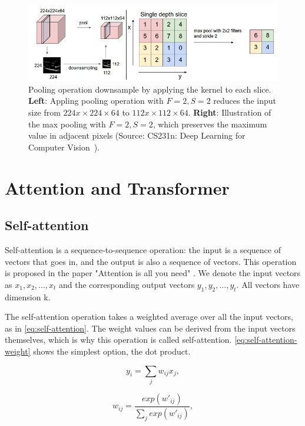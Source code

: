 \begin{figure}[h!]
    \centering
    \includegraphics[width=\linewidth]{content/resources/images/background/maxpool.png}
    \caption{Pooling operation downsample by applying the kernel to each slice. \textbf{Left}: Appling pooling operation with $F = 2, S = 2$ reduces the input size from $224x \times 224 \times 64$ to  $112x \times 112 \times 64$. \textbf{Right}: Illustration of the max pooling with $F = 2, S = 2$, which preserves the maximum value in adjacent pixels (Source: CS231n: Deep Learning for Computer Vision~\cite{Stanford-CS231n}).}
    \label{fig:chapter2-maxpool}
\end{figure}


\section{Attention and Transformer}
\subsection{Self-attention}
Self-attention is a sequence-to-sequence operation: the input is a sequence of vectors that goes in, and the output is also a sequence of vectors. This operation is proposed in the paper "Attention is all you need" \cite{Vaswani-NeurIPS2017-Attention}. We denote the input vectors as $x_1, x_2, ..., x_t$ and the corresponding output vectors $y_1, y_2, ..., y_t$. All vectors have dimension k.

The self-attention operation takes a weighted average over all the input vectors, as in \autoref{eq:self-attention}. The weight values can be derived from the input vectors themselves, which is why this operation is called self-attention. \autoref{eq:self-attention-weight} shows the simplest option, the dot product.

\begin{equation}
y_i = \sum_{j} w_{ij} x_j,
\label{eq:self-attention}
\end{equation}

\begin{equation}
w_{ij} = \dfrac{exp(w'_{ij})}{\sum_{j} exp(w'_{ij})},
\end{equation}

